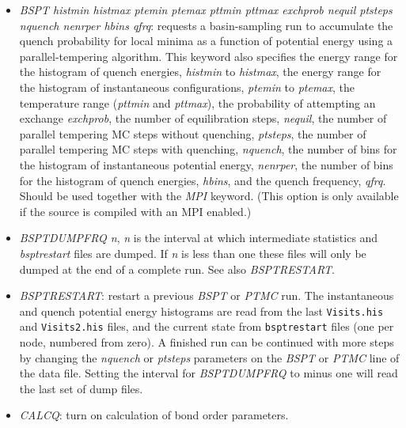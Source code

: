 \documentclass[12pt,a4paper,dvips]{article}
\begin{document}
\begin{itemize}
\item {\it BSPT histmin histmax ptemin ptemax pttmin pttmax exchprob nequil ptsteps nquench nenrper hbins qfrq\/}: 
requests a basin-sampling run to accumulate the quench probability for local minima 
as a function of potential energy using 
a parallel-tempering algorithm. 
This keyword also specifies the energy range for the histogram of quench energies,
{\it histmin\/} to {\it histmax\/},
the energy range for the histogram of instantaneous configurations, {\it ptemin} to {\it ptemax}, 
the temperature range ({\it pttmin} and {\it pttmax}), 
the probability of attempting an exchange {\it exchprob}, the 
number of equilibration steps, {\it nequil},
the number of parallel tempering MC steps without quenching,  {\it ptsteps},
the number of parallel tempering MC steps with quenching,  {\it nquench},
the number of bins for the histogram of instantaneous potential energy, {\it nenrper},
the number of bins for the histogram of quench energies, {\it hbins},  
and the quench frequency, {\it qfrq}.  
Should be used together with the {\it MPI\/} keyword. %
(This option is only available if the source is compiled with an MPI enabled.)  

\item {\it BSPTDUMPFRQ n\/}, {\it n\/} is the interval at which intermediate statistics
and {\it bsptrestart\/} files are dumped. If {\it n\/} is less than one these files
will only be dumped at the end of a complete run. 
See also {\it BSPTRESTART\/}.

\item {\it BSPTRESTART\/}: restart a previous {\it BSPT\/} or {\it PTMC\/} run.
The instantaneous and quench potential energy histograms are read from the last
{\tt Visits.his} and {\tt Visits2.his} files, and the current state from 
{\tt bsptrestart} files (one per node, numbered from zero).
A finished run can be continued with more steps by changing the {\it nquench} 
or {\it ptsteps} parameters on the {\it BSPT\/} or {\it PTMC\/} line of
the data file. Setting the interval for {\it BSPTDUMPFRQ} to
minus one will read the last set of dump files.


\item {\it CALCQ\/}: turn on calculation of bond order parameters.


\end{itemize}
\end{document}
